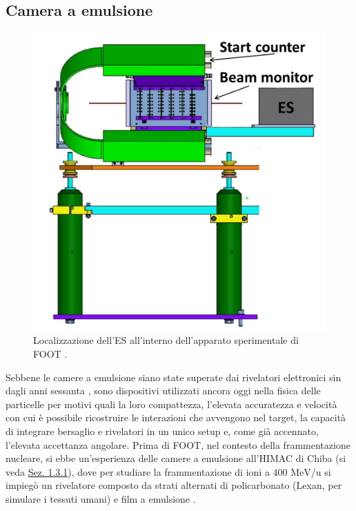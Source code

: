 \documentclass[12pt,a4paper,twoside]{report}
\begin{document}
	\subsection{Camera a emulsione}
	\begin{figure}[H]
		\centering
		\includegraphics[width=0.5\linewidth]{position_es.jpg}
		\caption{Localizzazione dell'ES all'interno dell'apparato sperimentale di FOOT \cite{foot_cdr}.}
		\label{fig:position_es}
	\end{figure}
	Sebbene le camere a emulsione siano state superate dai rivelatori elettronici sin dagli anni sessanta \cite{Ariga2020}, sono dispositivi utilizzati ancora oggi nella fisica delle particelle per motivi quali la loro compattezza, l'elevata accuratezza e velocità con cui è possibile ricostruire le interazioni che avvengono nel target, la capacità di integrare bersaglio e rivelatori in un unico setup e, come già accennato, l'elevata accettanza angolare. Prima di FOOT, nel contesto della frammentazione nucleare, si ebbe un'esperienza delle camere a emulsione all'HIMAC di Chiba (si veda \hyperref[sec:storia_adroterapia]{Sez. 1.3.1}), dove per studiare la frammentazione di ioni  a $400\mbox{ MeV/u}$ si impiegò un rivelatore composto da strati alternati di policarbonato (Lexan, per simulare i tessuti umani) e film a emulsione \cite{articleNakamura,articleLellis1,articleLellis2}.
	
\end{document}
